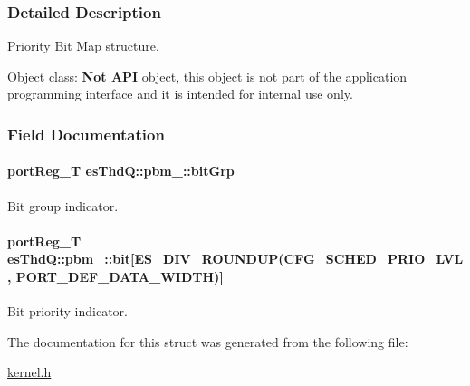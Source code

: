 \subsubsection{Detailed Description}
Priority Bit Map structure. 

\begin{DoxyParagraph}{Object class\-:}
{\bfseries Not A\-P\-I} object, this object is not part of the application programming interface and it is intended for internal use only. 
\end{DoxyParagraph}


\subsubsection{Field Documentation}
\hypertarget{structesThdQ_1_1pbm___aa24f418263c2f73a4a38d7f01fa3460a}{
\paragraph[{bit\-Grp}]{\setlength{\rightskip}{0pt plus 5cm}port\-Reg\-\_\-\-T es\-Thd\-Q\-::pbm\-\_\-\-::bit\-Grp}}\label{structesThdQ_1_1pbm___aa24f418263c2f73a4a38d7f01fa3460a}


Bit group indicator. 

\hypertarget{structesThdQ_1_1pbm___a3ba3044daa9e71d5e38acd0277dc9c58}{
\paragraph[{bit}]{\setlength{\rightskip}{0pt plus 5cm}port\-Reg\-\_\-\-T es\-Thd\-Q\-::pbm\-\_\-\-::bit\mbox{[}E\-S\-\_\-\-D\-I\-V\-\_\-\-R\-O\-U\-N\-D\-U\-P({\bf C\-F\-G\-\_\-\-S\-C\-H\-E\-D\-\_\-\-P\-R\-I\-O\-\_\-\-L\-V\-L}, P\-O\-R\-T\-\_\-\-D\-E\-F\-\_\-\-D\-A\-T\-A\-\_\-\-W\-I\-D\-T\-H)\mbox{]}}}\label{structesThdQ_1_1pbm___a3ba3044daa9e71d5e38acd0277dc9c58}


Bit priority indicator. 



The documentation for this struct was generated from the following file\-:\begin{DoxyCompactItemize}
\item 
\hyperlink{kernel_8h}{kernel.\-h}\end{DoxyCompactItemize}

